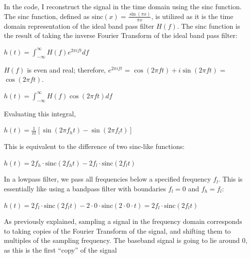 \documentclass{article}
\begin{document}
In the code, I reconstruct the signal in the time domain using the sinc function.
The sinc function, defined as $\text{sinc}(x) = \frac{\sin(\pi x)}{\pi x}$, is utilized as it is the time domain representation of the ideal band pass filter $H(f)$.
The sinc function is the result of taking the inverse Fourier Transform of the ideal band pass filter:
\begin{center}
    \begin{math}
        h(t) = \displaystyle \int_{-\infty}^{\infty} H(f) e^{2\pi i ft} df
    \end{math}  
\end{center}
$H(f)$ is even and real; therefore, $e^{2\pi i ft}$ = $\cos(2\pi ft) + i \sin(2\pi ft)$ = $\cos(2\pi ft)$.
\begin{center}
    \begin{math}
        h(t) = \displaystyle \int_{-\infty}^{\infty} H(f) \cos(2\pi ft) df
    \end{math}  
\end{center}
Evaluating this integral,
\begin{center}
    \begin{math}
        h(t) = \frac{1}{\pi t} \left[ \sin(2\pi f_h t) - \sin(2\pi f_l t) \right]
    \end{math}  
\end{center}
This is equivalent to the difference of two sinc-like functions:
\begin{center}
    \begin{math}
        h(t) = 2f_h \cdot \text{sinc}\left( 2 f_h t \right) - 2f_l \cdot \text{sinc}\left( 2 f_l t \right)
    \end{math}  
\end{center}
In a lowpass filter, we pass all frequencies below a specified frequency $f_l$. 
This is essentially like using a bandpass filter with boundaries $f_l = 0$ and $f_h = f_l$:
\begin{center}
    \begin{math}
        h(t) = 2f_l \cdot \text{sinc}\left( 2 f_l t \right) - 2 \cdot 0 \cdot \text{sinc}\left( 2 \cdot 0 \cdot t \right) = 2f_l \cdot \text{sinc}\left( 2 f_l t \right)
    \end{math}  
\end{center}

As previously explained, sampling a signal in the frequency domain corresponds to taking copies of the Fourier Transform of the signal, and shifting them to multiples of the sampling frequency.
The baseband signal is going to lie around 0, as this is the first ``copy'' of the signal
\end{document}
